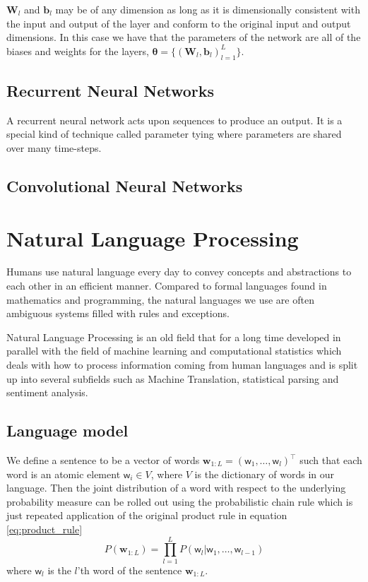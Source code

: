 $\bm{W}_l$ and $\bm{b}_l$ may be of any dimension as long as it is dimensionally consistent
with the input and output of the layer and conform to the original input and output
dimensions. In this case we have that the parameters of the network are all of
the biases and weights for the layers, $\bm{\theta} = \{(\bm{W}_l, \bm{b}_l)_{l
  = 1}^L\}$.

\subsection{Recurrent Neural Networks}
A recurrent neural network acts upon sequences to produce an output. It is a
special kind of technique called parameter tying where parameters are shared
over many time-steps.

\subsection{Convolutional Neural Networks}

\section{Natural Language Processing}

Humans use natural language every day to convey concepts and abstractions to each
other in an efficient manner. Compared to formal languages found in
mathematics and programming, the natural languages we use are often
ambiguous systems filled with rules and exceptions\cite{Rosenfeld00twodecades, sep-computational-linguistics}.

Natural Language Processing is an old field that for a long
time developed in parallel with the field of machine learning and
computational statistics which deals with how to process information coming from
human languages and is split up into several subfields such as Machine
Translation, statistical parsing and sentiment analysis\cite{sep-computational-linguistics}.

\subsection{Language model}
We define a sentence to be a vector of words $\bm{w}_{1:L} = (\mathsf{w}_1, \dots,
\mathsf{w}_l)^{\top}$ such that each word is an atomic element $\mathsf{w}_i \in
V$, where $V$ is the dictionary of words in our language. Then the joint
distribution of a word with respect to the underlying probability measure can be
rolled out using the probabilistic chain rule which is just repeated application
of the original product rule in equation \eqref{eq:product_rule}
\begin{equation}
  \label{eq:conditional_language_probability}
  P(\bm{w}_{1:L}) = \prod_{l = 1}^LP(\mathsf{w}_l | \mathsf{w}_1, \dots, \mathsf{w}_{l-1})
\end{equation}
where $\mathsf{w}_l$ is the $l$'th word of the sentence $\bm{w}_{1:L}$\cite{Bengio:2003:NPL:944919.944966}.

